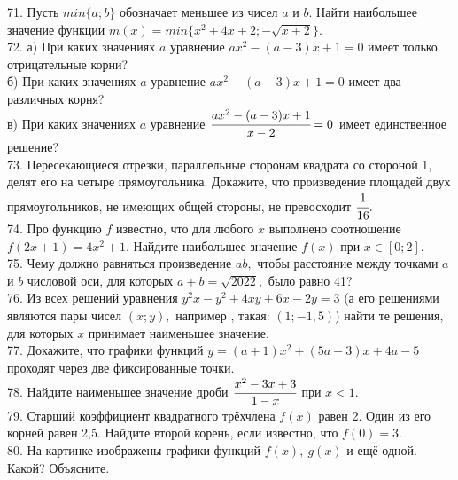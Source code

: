 \documentclass[12pt]{article}
\begin{document}
71. Пусть $min\{a;b\}$ обозначает меньшее из чисел $a$ и $b.$ Найти наибольшее значение функции $m(x)=min\{x^2+4x+2; -\sqrt{x+2}\}.$\\
72. а) При каких значениях $a$ уравнение $ax^2-(a-3)x+1=0$ имеет только отрицательные корни?\\
б) При каких значениях $a$ уравнение $ax^2-(a-3)x+1=0$ имеет два различных корня?\\
в) При каких значениях $a$ уравнение $\cfrac{ax^2-(a-3)x+1}{x-2}=0$ имеет единственное решение?\\
73. Пересекающиеся отрезки, параллельные сторонам квадрата со стороной 1, делят его на четыре прямоугольника. Докажите, что произведение площадей двух прямоугольников, не имеющих общей стороны, не превосходит $\cfrac{1}{16}.$\\
74. Про функцию $f$ известно, что для любого $x$ выполнено соотношение $f(2x+1)=4x^2+1.$ Найдите наибольшее значение $f(x)$ при $x\in[0;2].$\\
75. Чему должно равняться произведение $ab,$ чтобы расстояние между точками $a$ и $b$ числовой оси, для которых $a+b=\sqrt{2022},$ было равно 41?\\
76. Из всех решений уравнения $y^2x-y^2+4xy+6x-2y=3$ (а его решениями являются пары чисел $(x;y),$ например , такая: $(1;-1,5)$) найти те решения, для которых $x$ принимает наименьшее значение.\\
77. Докажите, что графики функций $y=(a+1)x^2+(5a-3)x+4a-5$ проходят через две фиксированные точки.\\
78. Найдите наименьшее значение дроби $\cfrac{x^2-3x+3}{1-x}$ при $x<1.$\\
79. Старший коэффициент квадратного трёхчлена $f(x)$ равен 2. Один из его корней равен 2,5. Найдите второй корень, если известно, что $f(0)=3.$\\
80. На картинке изображены графики функций $f(x),\ g(x)$ и ещё одной. Какой?
Объясните.\\
\begin{figure}[ht!]
\end{figure}\\
\end{document}
